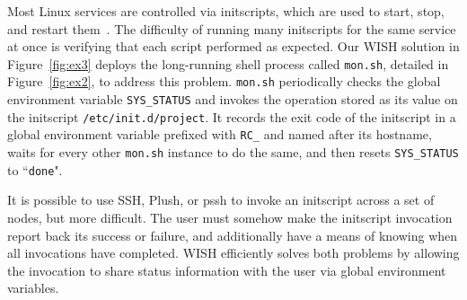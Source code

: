  




Most Linux services are controlled via initscripts, which are used to start,
stop, and restart them~\cite{linuxbase}.  The difficulty of running many
initscripts for the same service at once is verifying that each script
performed as expected.  Our WISH solution in Figure~\ref{fig:ex3} deploys the
long-running shell process called \texttt{mon.sh}, detailed in
Figure~\ref{fig:ex2}, to address this problem.  \texttt{mon.sh} periodically
checks the global environment variable \texttt{SYS\_STATUS} and invokes the
operation stored as its value on the initscript \texttt{/etc/init.d/project}.
It records the exit code of the initscript in a global environment variable
prefixed with \texttt{RC\_} and named after its hostname, waits for every
other \texttt{mon.sh} instance to do the same, and then resets
\texttt{SYS\_STATUS} to ``\texttt{done}".

It is possible to use SSH, Plush, or pssh to invoke an initscript across a set
of nodes, but more difficult.  The user must somehow make the initscript
invocation report back its success or failure, and additionally have a means
of knowing when all invocations have completed.  WISH efficiently solves both
problems by allowing the invocation to share status information with the user
via global environment variables.
